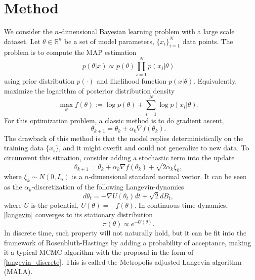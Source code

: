 \documentclass[10pt]{amsart}
\newcommand{\gf}{\nabla f}
\begin{document}
\section{Method}
We consider the $n$-dimensional Bayesian learning problem with a large scale dataset. Let $\theta\in\mathbb{R}^n$ be a set of model parameters, $\{x_i\}_{i=1}^N$ data points. The problem is to compute the MAP estimation 
\begin{equation}
    p(\theta|x)\propto p(\theta)\prod_{i=1}^N p(x_i|\theta)
\end{equation}
using prior distribution $p(\cdot)$ and likelihood function $p(x|\theta)$.
Equivalently, maximize the logarithm of posterior distribution density
\begin{equation} \label{logmap}
    \max_{\theta} f(\theta):=\log p(\theta) + \sum_{i=1}^N \log p(x_i|\theta).
\end{equation}
For this optimization problem, a classic method is to do gradient ascent,
\begin{equation}
    \theta_{k+1}=\theta_k + \alpha_k \gf(\theta_k).
\end{equation}
The drawback of this method is that the model replies deterministically on the training data $\{x_i\}$, and it might overfit and could not generalize to new data. To circumvent this situation, consider adding a stochastic term into the update
\begin{equation}\label{langevin_discrete}
    \theta_{k+1}=\theta_k + \alpha_k \gf(\theta_k) + \sqrt{2\alpha_k}\xi_k,
\end{equation}
where $\xi_k\sim N(0,I_n)$ is a $n$-dimensional standard normal vector. It can be seen as the $\alpha_k$-discretization of the following Langevin-dynamics
\begin{equation} \label{langevin}
    d\theta_t = -\nabla U(\theta_t)dt+\sqrt{2}dB_t,
\end{equation}
where $U$ is the potential, $U(\theta)=-f(\theta)$. In continuous-time dynamics, \eqref{langevin} converges to its stationary distribution 
\begin{equation}
    \pi(\theta)\propto e^{-U(\theta)}.
\end{equation}
In discrete time, such property will not naturally hold, but it can be fit into the framework of Rosenbluth-Hastings by adding a probability of acceptance, making it a typical MCMC algorithm with the proposal in the form of \eqref{langevin_discrete}. This is called the Metropolis adjusted Langevin algorithm (MALA). 
\end{document}
